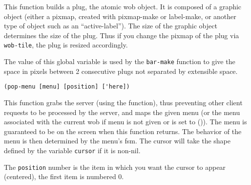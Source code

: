 This function builds a plug, the atomic wob object. It is composed of a
graphic object (either a pixmap, created with pixmap-make or label-make, or
another type of object such as an ``active-label''). The size of the
graphic object determines the size of the plug.  Thus if you change the
pixmap of the plug via \verb"wob-tile", the plug is resized
accordingly.


        

The value of this global variable is used by the \verb"bar-make" function to
give the space in pixels between 2 consecutive plugs not separated by
extensible space.

        
{\usagefont\begin{verbatim}
(pop-menu [menu] [position] ['here])
\end{verbatim}}\usageupspace

This function grabs the server (using the  function), thus
preventing other client requests to be processed by the server, and maps the
given menu (or the menu associated with the current wob if menu
is not given or is set to ()). The menu is guaranteed to be on the screen
when this function returns.
The behavior of the menu is then determined by
the menu's fsm. The cursor will take the shape defined by the variable
\verb"cursor" if it is  non-nil.

The \verb"position" number is the item in which you want the cursor to appear
(centered), the first item is numbered 0.

